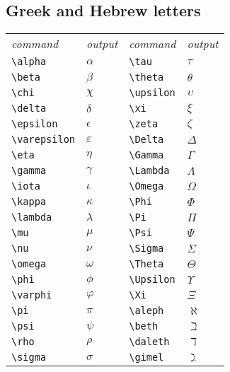 \begin{multicols}{3}
\subsection{Greek and Hebrew letters}
\begin{tabular}{llll}
\emph{command} & \emph{output}&\emph{command} & \emph{output}\\
\verb!\alpha! & $\alpha$&\verb!\tau! & $\tau$\\
\verb!\beta! & $\beta$&\verb!\theta! & $\theta$\\
\verb!\chi! & $\chi$&\verb!\upsilon! & $\upsilon$\\
\verb!\delta! & $\delta$&\verb!\xi! & $\xi$\\
\verb!\epsilon! & $\epsilon$&\verb!\zeta! & $\zeta$\\
\verb!\varepsilon! & $\varepsilon$&\verb!\Delta! & $\Delta$\\
\verb!\eta! & $\eta$&\verb!\Gamma! & $\Gamma$\\
\verb!\gamma! & $\gamma$&\verb!\Lambda! & $\Lambda$\\
\verb!\iota! & $\iota$&\verb!\Omega! & $\Omega$\\
\verb!\kappa! & $\kappa$&\verb!\Phi! & $\Phi$\\
\verb!\lambda! & $\lambda$&\verb!\Pi! & $\Pi$\\
\verb!\mu! & $\mu$&\verb!\Psi! & $\Psi$\\
\verb!\nu! & $\nu$&\verb!\Sigma! & $\Sigma$\\
\verb!\omega! & $\omega$&\verb!\Theta! & $\Theta$\\
\verb!\phi! & $\phi$&\verb!\Upsilon! & $\Upsilon$\\
\verb!\varphi! & $\varphi$&\verb!\Xi! & $\Xi$\\
\verb!\pi! & $\pi$&\verb!\aleph! & $\aleph$\\
\verb!\psi! & $\psi$&\verb!\beth! & $\beth$\\
\verb!\rho! & $\rho$&\verb!\daleth! & $\daleth$\\
\verb!\sigma! & $\sigma$&\verb!\gimel! & $\gimel$
\end{tabular}



\end{multicols}
